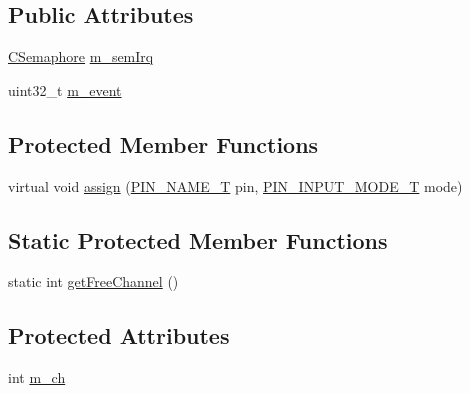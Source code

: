 \subsection*{Public Attributes}
\begin{DoxyCompactItemize}
\item 
\hyperlink{class_c_semaphore}{C\-Semaphore} \hyperlink{class_c_pin_i_n_t_a183f478d30ac65d5a3e85c7939db044e}{m\-\_\-sem\-Irq}
\item 
uint32\-\_\-t \hyperlink{class_c_pin_i_n_t_a53b3ac0896504d345f4b6093cb22f3f3}{m\-\_\-event}
\end{DoxyCompactItemize}
\subsection*{Protected Member Functions}
\begin{DoxyCompactItemize}
\item 
virtual void \hyperlink{class_c_pin_i_n_t_a762631f4e29ba2f09257af8892f8777e}{assign} (\hyperlink{group___enumerations_ga65a2241721e4acb573e0c3fe29ac432f}{P\-I\-N\-\_\-\-N\-A\-M\-E\-\_\-\-T} pin, \hyperlink{group___enumerations_ga9f8f32709b482732d6e377ff26da36ef}{P\-I\-N\-\_\-\-I\-N\-P\-U\-T\-\_\-\-M\-O\-D\-E\-\_\-\-T} mode)
\end{DoxyCompactItemize}
\subsection*{Static Protected Member Functions}
\begin{DoxyCompactItemize}
\item 
static int \hyperlink{class_c_pin_i_n_t_ac638835b5fd1ca3f7c29af36677e2b0a}{get\-Free\-Channel} ()
\end{DoxyCompactItemize}
\subsection*{Protected Attributes}
\begin{DoxyCompactItemize}
\item 
int \hyperlink{class_c_pin_i_n_t_a563b913b2126f003c0e1e2f3400a2ed2}{m\-\_\-ch}
\end{DoxyCompactItemize}


